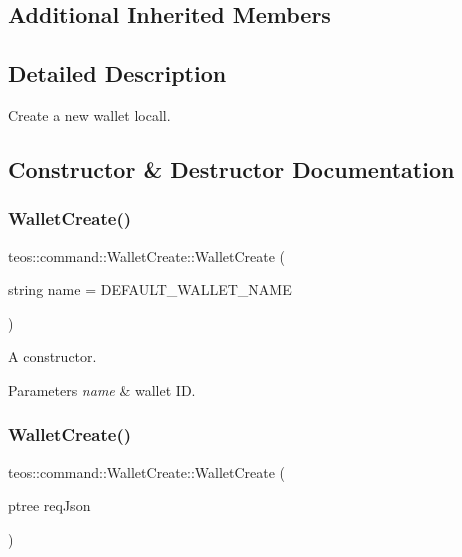 \subsection*{Additional Inherited Members}


\subsection{Detailed Description}
Create a new wallet locall. 

\subsection{Constructor \& Destructor Documentation}
\mbox{\label{classteos_1_1command_1_1_wallet_create_a78153f8e5eb577cdeb3734c7229df923}} 
\subsubsection{\texorpdfstring{Wallet\+Create()}{WalletCreate()}\hspace{0.1cm}{\footnotesize\ttfamily [1/2]}}
{\footnotesize\ttfamily teos\+::command\+::\+Wallet\+Create\+::\+Wallet\+Create (\begin{DoxyParamCaption}\item[{string}]{name = {\ttfamily DEFAULT\+\_\+WALLET\+\_\+NAME} }\end{DoxyParamCaption})\hspace{0.3cm}{\ttfamily [inline]}}



A constructor. 


\begin{DoxyParams}{Parameters}
{\em name} & wallet ID. \\
\hline
\end{DoxyParams}
\mbox{\label{classteos_1_1command_1_1_wallet_create_a3a7979db66f2ea69186888d50dd6ce69}} 
\subsubsection{\texorpdfstring{Wallet\+Create()}{WalletCreate()}\hspace{0.1cm}{\footnotesize\ttfamily [2/2]}}
{\footnotesize\ttfamily teos\+::command\+::\+Wallet\+Create\+::\+Wallet\+Create (\begin{DoxyParamCaption}\item[{ptree}]{req\+Json }\end{DoxyParamCaption})\hspace{0.3cm}{\ttfamily [inline]}}



